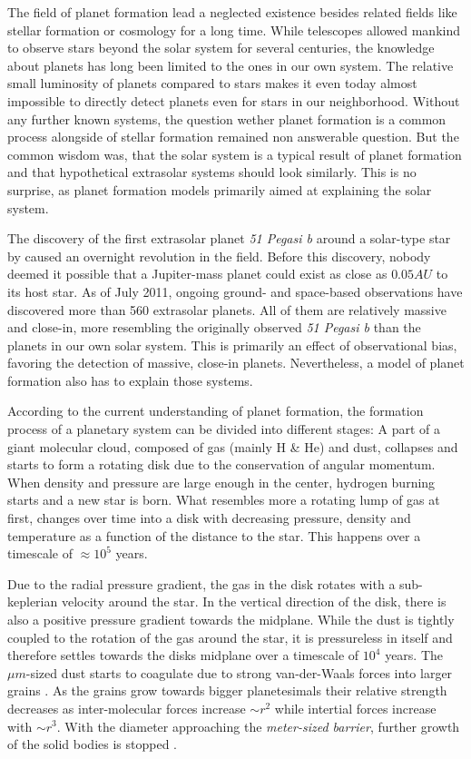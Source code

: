 The field of planet formation lead a neglected existence besides related fields like stellar formation or cosmology for a long time. While telescopes allowed mankind to observe stars beyond the solar system for several centuries, the knowledge about planets has long been limited to the ones in our own system. The relative small luminosity of planets compared to stars makes it even today almost impossible to directly detect planets even for stars in our neighborhood. Without any further known systems, the question wether planet formation is a common process alongside of stellar formation remained non answerable question. But the common wisdom was, that the solar system is a typical result of planet formation and that hypothetical extrasolar systems should look similarly. This is no surprise, as planet formation models primarily aimed at explaining the solar system.

The discovery of the first extrasolar planet \emph{51 Pegasi b} around a solar-type star by \cite{1995Natur.378..355M} caused an overnight revolution in the field. 
Before this discovery, nobody deemed it possible that a Jupiter-mass planet could exist as close as $0.05 AU$ to its host star. As of July 2011, ongoing ground- and space-based observations have discovered more than 560 extrasolar planets. All of them are relatively massive and close-in, more resembling the originally observed \emph{51 Pegasi b} than the planets in our own solar system. This is primarily an effect of observational bias, favoring the detection of massive, close-in planets. Nevertheless, a model of planet formation also has to explain those systems.

According to the current understanding of planet formation, the formation process of a planetary system can be divided into different stages: A part of a giant molecular cloud, composed of gas (mainly H \& He) and dust, collapses and starts to form a rotating disk due to the conservation of angular momentum. When density and pressure are large enough in the center, hydrogen burning starts and a new star is born. What resembles more a rotating lump of gas at first, changes over time into a disk with decreasing pressure, density and temperature as a function of the distance to the star. This happens over a timescale of $\approx 10^5$ years.


Due to the radial pressure gradient, the gas in the disk rotates with a sub-keplerian velocity around the star. In the vertical direction of the disk, there is also a positive pressure gradient towards the midplane. While the dust is tightly coupled to the rotation of the gas around the star, it is pressureless in itself and therefore settles towards the disks midplane over a timescale of $10^4$ years. The $\mu m$-sized dust starts to coagulate due to strong van-der-Waals forces into larger grains \citep{2010A&A...513A..56G}. As the grains grow towards bigger planetesimals their relative strength decreases as inter-molecular forces increase $\sim r^2$ while intertial forces increase with $\sim r^3$. With the diameter approaching the \emph{meter-sized barrier}, further growth of the solid bodies is stopped \citep{Benz1999Icar..142....5B}.

